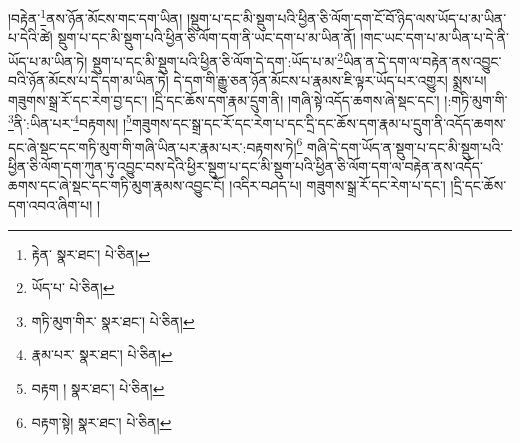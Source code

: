 །བརྟེན་\footnote{རྟེན་  སྣར་ཐང་།  པེ་ཅིན། }ནས་ཉོན་མོངས་གང་དག་ཡིན། །སྡུག་པ་དང་མི་སྡུག་པའི་ཕྱིན་ཅི་ལོག་དག་ངོ་བོ་ཉིད་ལས་ཡོད་པ་མ་ཡིན་པ་དེའི་ཚེ། སྡུག་པ་དང་མི་སྡུག་པའི་ཕྱིན་ཅི་ལོག་དག་ནི་ཡང་དག་པ་མ་ཡིན་ནོ། །གང་ཡང་དག་པ་མ་ཡིན་པ་དེ་ནི་ཡོད་པ་མ་ཡིན་ཏེ། སྡུག་པ་དང་མི་སྡུག་པའི་ཕྱིན་ཅི་ལོག་དེ་དག་:ཡོད་པ་མ་\footnote{ཡོད་པ་  པེ་ཅིན། }ཡིན་ན་དེ་དག་ལ་བརྟེན་ནས་འབྱུང་བའི་ཉོན་མོངས་པ་དེ་དག་མ་ཡིན་ཏེ། དེ་དག་གི་རྒྱུ་ཅན་ཉོན་མོངས་པ་རྣམས་ཇི་ལྟར་ཡོད་པར་འགྱུར། སྨྲས་པ། གཟུགས་སྒྲ་རོ་དང་རེག་བྱ་དང་། །དྲི་དང་ཆོས་དག་རྣམ་དྲུག་ནི། །གཞི་སྟེ་འདོད་ཆགས་ཞེ་སྡང་དང་། །:གཏི་མུག་གི་\footnote{གཏི་མུག་གིར་  སྣར་ཐང་།  པེ་ཅིན། }ནི་:ཡིན་པར་\footnote{རྣམ་པར་  སྣར་ཐང་།  པེ་ཅིན། }བརྟགས། །\footnote{བརྟག །  སྣར་ཐང་།  པེ་ཅིན། }གཟུགས་དང་སྒྲ་དང་རོ་དང་རེག་པ་དང་དྲི་དང་ཆོས་དག་རྣམ་པ་དྲུག་ནི་འདོད་ཆགས་དང་ཞེ་སྡང་དང་གཏི་མུག་གི་གཞི་ཡིན་པར་རྣམ་པར་:བརྟགས་ཏེ།\footnote{བརྟག་སྟེ།  སྣར་ཐང་།  པེ་ཅིན། } གཞི་དེ་དག་ཡོད་ན་སྡུག་པ་དང་མི་སྡུག་པའི་ཕྱིན་ཅི་ལོག་དག་ཀུན་ཏུ་འབྱུང་བས་དེའི་ཕྱིར་སྡུག་པ་དང་མི་སྡུག་པའི་ཕྱིན་ཅི་ལོག་དག་ལ་བརྟེན་ནས་འདོད་ཆགས་དང་ཞེ་སྡང་དང་གཏི་མུག་རྣམས་འབྱུང་ངོ། །འདིར་བཤད་པ། གཟུགས་སྒྲ་རོ་དང་རེག་པ་དང་། །དྲི་དང་ཆོས་དག་འབའ་ཞིག་པ། །
